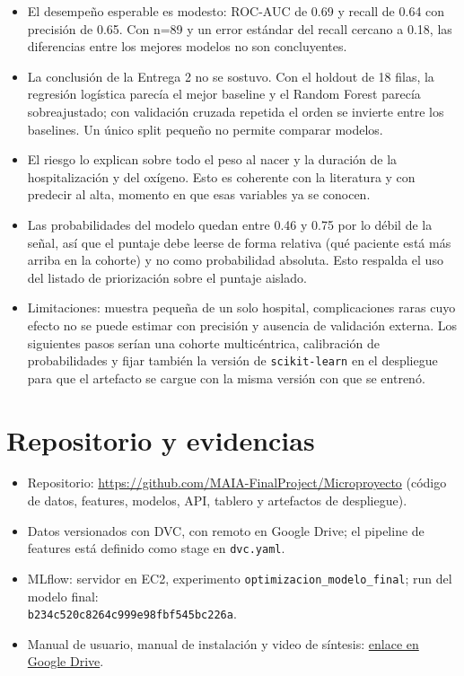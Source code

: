 \documentclass{llncs}
\begin{document}
\begin{itemize}
\item El desempeño esperable es modesto: ROC-AUC de 0.69 y recall de 0.64 con
precisión de 0.65. Con n=89 y un error estándar del recall cercano a 0.18, las
diferencias entre los mejores modelos no son concluyentes.
\item La conclusión de la Entrega 2 no se sostuvo. Con el holdout de 18 filas,
la regresión logística parecía el mejor baseline y el Random Forest parecía
sobreajustado; con validación cruzada repetida el orden se invierte entre los
baselines. Un único split pequeño no permite comparar modelos.
\item El riesgo lo explican sobre todo el peso al nacer y la duración de la
hospitalización y del oxígeno. Esto es coherente con la literatura y con
predecir al alta, momento en que esas variables ya se conocen.
\item Las probabilidades del modelo quedan entre 0.46 y 0.75 por lo débil de la
señal, así que el puntaje debe leerse de forma relativa (qué paciente está más
arriba en la cohorte) y no como probabilidad absoluta. Esto respalda el uso
del listado de priorización sobre el puntaje aislado.
\item Limitaciones: muestra pequeña de un solo hospital, complicaciones raras
cuyo efecto no se puede estimar con precisión y ausencia de validación externa.
Los siguientes pasos serían una cohorte multicéntrica, calibración de
probabilidades y fijar también la versión de \texttt{scikit-learn} en el
despliegue para que el artefacto se cargue con la misma versión con que se
entrenó.
\end{itemize}

\section{Repositorio y evidencias}

\begin{itemize}
\item Repositorio: \url{https://github.com/MAIA-FinalProject/Microproyecto}
(código de datos, features, modelos, API, tablero y artefactos de despliegue).
\item Datos versionados con DVC, con remoto en Google Drive; el pipeline de
features está definido como stage en \texttt{dvc.yaml}.
\item MLflow: servidor en EC2, experimento \texttt{optimizacion\_modelo\_final};
run del modelo final:\\ \texttt{b234c520c8264c999e98fbf545bc226a}.
\item Manual de usuario, manual de instalación y video de síntesis:
\href{https://drive.google.com/file/d/114ZuO4xJnnT2z76jxk2Ibz5pW-Ksr1J5/view}{enlace en Google Drive}.
\end{itemize}
\end{document}
